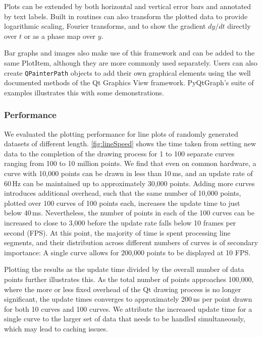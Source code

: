 Plots can be extended by both horizontal and vertical error bars and annotated by text labels. Built in routines can also transform the plotted data to provide logarithmic scaling, Fourier transforms, and to show the gradient $dy/dt$ directly over $t$ or as a phase map over $y$.

Bar graphs and images also make use of this framework and can be added to the same PlotItem, although they are more commonly used separately. Users can also create \texttt{QPainterPath} objects to add their own graphical elements using the well documented methods of the Qt Graphics View framework. PyQtGraph's suite of examples\cite{pg_examples} illustrates this with some demonstrations.


\subsubsection{Performance}

We evaluated the plotting performance for line plots of randomly generated datasets of different length. \autoref{fig:lineSpeed} shows the time taken from setting new data to the completion of the drawing process for 1 to 100 separate curves ranging from 100 to 10 million points. We find that even on common hardware, a curve with 10,000 points can be drawn in less than 10\,ms, and an update rate of 60\,Hz can be maintained up to approximately 30,000 points. Adding more curves introduces additional overhead, such that the same number of 10,000 points, plotted over 100 curves of 100 points each, increases the update time to just below 40\,ms. Nevertheless, the number of points in each of the 100 curves can be increased to close to 3,000 before the update rate falls below 10 frames per second (FPS). At this point, the majority of time is spent processing line segments, and their distribution across different numbers of curves is of secondary importance: A single curve allows for 200,000 points to be displayed at 10 FPS. 

Plotting the results as the update time divided by the overall number of data points further illustrates this. As the total number of points approaches 100,000, where the more or less fixed overhead of the Qt drawing process is no longer significant, the update times converges to approximately 200\,ns per point drawn for both 10 curves and 100 curves. We attribute the increased update time for a single curve to the larger set of data that needs to be handled simultaneously, which may lead to caching issues.

